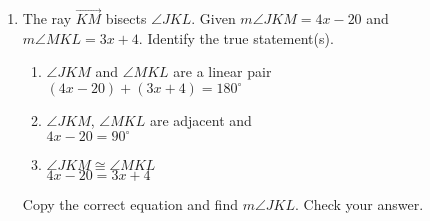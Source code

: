 \begin{enumerate}
\item The ray $\overrightarrow{KM}$ bisects $\angle JKL$. Given $m\angle JKM = 4x-20$ and \\$m\angle MKL = 3x+4$. Identify the true statement(s).
 \begin{multicols}{2}
    \begin{enumerate}
      \item $\angle JKM$ and $\angle MKL$ are a linear pair\\
      $(4x-20) + (3x+4)=180^\circ$
      \item $\angle JKM$, $\angle MKL$ are adjacent and\\
      $4x-20 =90^\circ$
      \item $\angle JKM \cong \angle MKL$\\
      $4x-20 = 3x+4$
  \end{enumerate}
  \begin{center}
  \end{center}
\end{multicols}
Copy the correct equation and find $m\angle JKL$. Check your answer. \vspace{2cm}

\end{enumerate}
